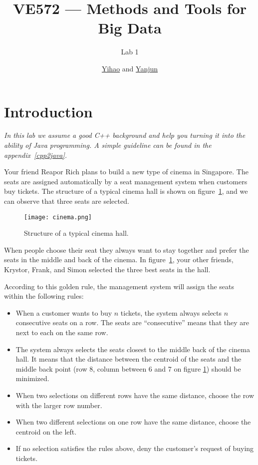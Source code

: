 \documentclass[11pt,a4paper]{article}
\title{VE572 --- Methods and Tools for Big Data}
\subtitle{Lab 1}
\author{\href{mailto:liuyh615@sjtu.edu.cn}{Yihao} and \href{mailto:AuroraZYJ@sjtu.edu.cn}{Yanjun}}
\begin{document}
\maketitle

\section{Introduction}

\begin{center}\em In this lab we assume a good C++ background and help you turning it into the ability of Java programming. A simple guideline can be found in the appendix~\ref{cpp2java}.
\end{center}

Your friend Reapor Rich plans to build a new type of cinema in Singapore. The seats are assigned automatically by a seat management system when customers buy tickets. The structure of a typical cinema hall is shown on figure~\ref{fig:cinema}, and we can observe that three seats are selected. 

\begin{figure}[H]
    \centering
    \texttt{[image: cinema.png]}
    \caption{Structure of a typical cinema hall.}
    \label{fig:cinema}
\end{figure}

When people choose their seat they always want to stay together and prefer the seats in the middle and back of the cinema.  In figure~\ref{fig:cinema}, your other friends, Krystor, Frank, and Simon selected the three best seats in the hall. \medskip

According to this golden rule, the management system will assign the seats within the following rules:

\begin{itemize}
    \item When a customer wants to buy $n$ tickets, the system always selects $n$ consecutive seats on a row. The seats are ``consecutive'' means that they are next to each on the same row.
    \item The system always selects the seats closest to the middle back of the cinema hall. It means that the distance between the centroid of the seats and the middle back point (row 8, column between 6 and 7 on figure \ref{fig:cinema}) should be minimized.
    \item When two selections on different rows have the same distance, choose the row with the larger row number.
    \item When two different selections on one row have the same distance, choose the centroid on the left.
    \item If no selection satisfies the rules above, deny the customer's request of buying tickets.
\end{itemize}
\end{document}
